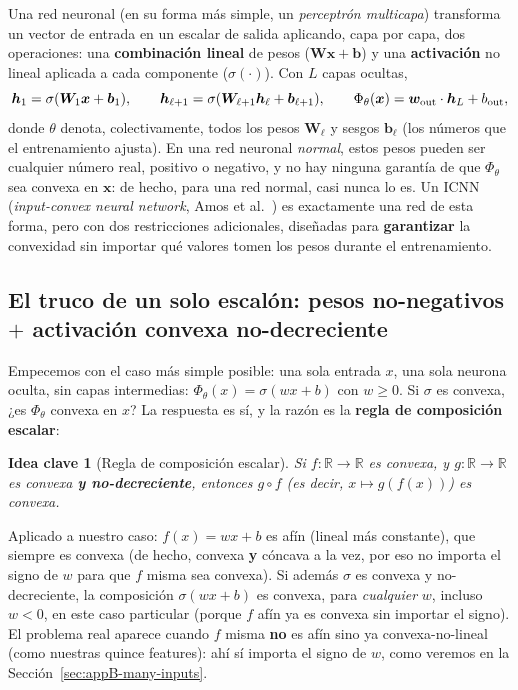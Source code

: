 \documentclass[11pt,a4paper]{article}
\newtheorem{takeaway}{Idea clave}
\newcommand{\R}{\mathbb{R}}
\begin{document}
Una red neuronal (en su forma m\'as simple, un \emph{perceptr\'on
multicapa}) transforma un vector de entrada en un escalar de salida
aplicando, capa por capa, dos operaciones: una \textbf{combinaci\'on
lineal} de pesos ($\bm W\bm x+\bm b$) y una \textbf{activaci\'on} no
lineal aplicada a cada componente ($\sigma(\cdot)$). Con $L$ capas
ocultas,
\[
 \bm h_1=\sigma(\bm W_1\bm x+\bm b_1),\qquad
 \bm h_{\ell+1}=\sigma(\bm W_{\ell+1}\bm h_\ell+\bm b_{\ell+1}),\qquad
 \Phi_\theta(\bm x)=\bm w_{\rm out}\cdot \bm h_L+b_{\rm out},
\]
donde $\theta$ denota, colectivamente, todos los pesos $\bm W_\ell$ y
sesgos $\bm b_\ell$ (los n\'umeros que el entrenamiento ajusta). En una
red neuronal \emph{normal}, estos pesos pueden ser cualquier n\'umero
real, positivo o negativo, y no hay ninguna garant\'ia de que
$\Phi_\theta$ sea convexa en $\bm x$: de hecho, para una red normal, casi
nunca lo es. Un ICNN (\emph{input-convex neural network},
Amos et al.~\cite{Amos2017}) es exactamente una red de esta forma, pero
con dos restricciones adicionales, dise\~nadas para \textbf{garantizar}
la convexidad sin importar qu\'e valores tomen los pesos durante el
entrenamiento.

\subsection{El truco de un solo escal\'on: pesos no-negativos $+$ activaci\'on convexa no-decreciente}

Empecemos con el caso m\'as simple posible: una sola entrada $x$, una
sola neurona oculta, sin capas intermedias: $\Phi_\theta(x)=\sigma(wx+b)$
con $w\geq0$. Si $\sigma$ es convexa, ¿es $\Phi_\theta$ convexa en $x$?
La respuesta es s\'i, y la raz\'on es la \textbf{regla de composici\'on
escalar}:

\begin{takeaway}[Regla de composici\'on escalar]
Si $f:\R\to\R$ es convexa, y $g:\R\to\R$ es convexa \textbf{y
no-decreciente}, entonces $g\circ f$ (es decir, $x\mapsto g(f(x))$) es
convexa.
\end{takeaway}

Aplicado a nuestro caso: $f(x)=wx+b$ es af\'in (lineal m\'as constante),
que siempre es convexa (de hecho, convexa \textbf{y} c\'oncava a la vez,
por eso no importa el signo de $w$ para que $f$ misma sea convexa). Si
adem\'as $\sigma$ es convexa y no-decreciente, la composici\'on
$\sigma(wx+b)$ es convexa, para \emph{cualquier} $w$, incluso $w<0$, en
este caso particular (porque $f$ af\'in ya es convexa sin importar el
signo). El problema real aparece cuando $f$ misma \textbf{no} es
af\'in sino ya convexa-no-lineal (como nuestras quince features): ah\'i
s\'i importa el signo de $w$, como veremos en la Secci\'on~\ref{sec:appB-many-inputs}.
\end{document}
